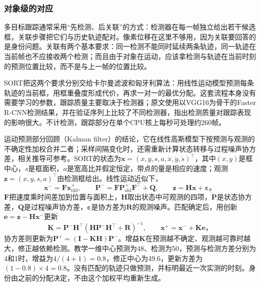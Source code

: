 \subsubsection{对象级的对应}
\label{sec:vision-video-association}
\label{sec:vision-video-motion-assignment}
\label{sec:vision-video-bytetrack}

多目标跟踪通常采用“先检测、后关联”的方式：检测器在每一帧独立给出若干候选框，关联步骤把它们与历史轨迹配对。像素位移在这里不够用，因为关联要回答的是身份问题。关联有两个基本要求：同一检测不能同时延续两条轨迹，同一轨迹在当前帧也不应接收两个检测；而且由于对象在运动，应该拿检测与轨迹在当前时刻的预测位置比较，而不是与上一帧的位置比较。

SORT把这两个要求分别交给卡尔曼滤波和匈牙利算法：用线性运动模型预测每条轨迹的当前框，用框重叠度形成代价，再求一对一的最优分配。这套流程本身没有需要学习的参数，跟踪质量主要取决于检测器；原文使用以VGG16为骨干的Faster R-CNN检测结果，并在验证序列上比较了不同检测器，指出检测质量对跟踪表现的影响很大。不计检测，跟踪部分在单个CPU核上每秒可处理约260帧。

运动预测部分回顾（Kalman filter）的结论，它在线性高斯模型下按预测与观测的不确定性加权合并二者；采样间隔变化时，还需重新计算状态转移与过程噪声协方差，相关推导可参考。SORT的状态为$\bm{x}=(x,y,s,a,\dot{x},\dot{y},\dot{s})^\top$，其中$(x,y)$是框中心，$s$是框面积，$a$是宽高比并假定恒定，带点的量是相应的速度；观测$\bm{z}=(x,y,s,a)^\top$由检测框给出。线性运动近似下，
\begin{equation}
  \bm{x}^{-}=\bm{F}\bm{x}^{+}_{\mathrm{old}},\qquad
  \bm{P}^{-}=\bm{F}\bm{P}^{+}_{\mathrm{old}}\bm{F}^{\top}+\bm{Q},\qquad
  \bm{z}=\bm{H}\bm{x}+\bm{\varepsilon}\text{。}
  \label{eq:vision-video-kalman-predict}
\end{equation}
$\bm{F}$把速度乘时间差加到位置与面积上，$\bm{H}$取出状态中可观测的四项，$\bm{P}$是状态协方差，$\bm{Q}$是过程噪声协方差，$\bm{\varepsilon}$是协方差为$\bm{R}$的观测噪声。匹配确定后，用创新$\bm{e}=\bm{z}-\bm{H}\bm{x}^{-}$更新
\[
  \bm{K}=\bm{P}^{-}\bm{H}^{\top}
  (\bm{H}\bm{P}^{-}\bm{H}^{\top}+\bm{R})^{-1},
  \qquad
  \bm{x}^{+}=\bm{x}^{-}+\bm{K}\bm{e}\text{，}
\]
协方差则更新为$\bm{P}^{+}=(\bm{I}-\bm{K}\bm{H})\bm{P}^{-}$。增益$\bm{K}$在预测越不确定、观测越可靠时越大，修正越依赖检测。教学一维中心预测为48、检测为50，预测与检测方差分别为4和1时，增益为$4/(4+1)=0.8$，修正中心为49.6，更新方差为$(1-0.8)\times4=0.8$。没有匹配的轨迹只做预测，并标明最近一次实测的时刻。身份由之前的分配决定，不由这个加权平均重新生成。

